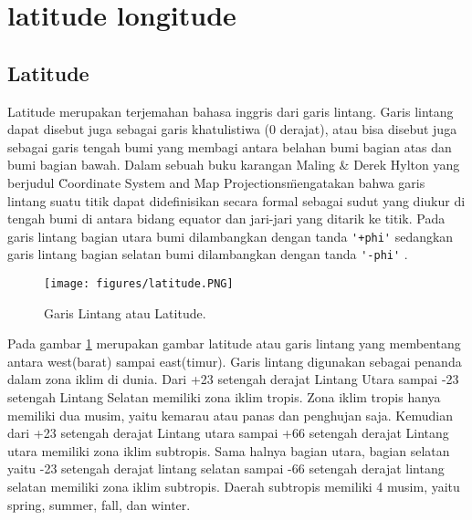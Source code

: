 
\section{latitude longitude}

\subsection{Latitude}
Latitude merupakan terjemahan bahasa inggris dari garis lintang. Garis lintang dapat disebut juga sebagai garis khatulistiwa (0 derajat), atau bisa disebut juga sebagai garis tengah bumi yang membagi antara belahan bumi bagian atas dan bumi bagian bawah.
Dalam sebuah buku karangan Maling \& Derek Hylton yang berjudul \"Coordinate System and Map Projections\" mengatakan bahwa garis lintang suatu titik dapat didefinisikan secara formal sebagai sudut yang diukur di tengah bumi di antara bidang equator dan jari-jari yang ditarik ke titik. 
Pada garis lintang bagian utara bumi dilambangkan dengan tanda \verb|'+phi'| 
sedangkan garis lintang bagian selatan bumi dilambangkan dengan tanda \verb|'-phi'| 
\cite{maling2013coordinate}. 

	\begin{figure}[ht]
	\centerline{\texttt{[image: figures/latitude.PNG]}}
	\caption{Garis Lintang atau Latitude.}
	\label{latitude}
	\end{figure}
Pada gambar \ref{latitude} merupakan gambar latitude atau garis lintang yang membentang antara west(barat) sampai east(timur).
Garis lintang digunakan sebagai penanda dalam zona iklim di dunia. Dari +23 setengah derajat Lintang Utara sampai -23 setengah Lintang Selatan memiliki zona iklim tropis. Zona iklim tropis hanya memiliki dua musim, yaitu kemarau atau panas dan penghujan saja. Kemudian dari +23 setengah derajat Lintang utara sampai +66 setengah derajat Lintang utara memiliki zona iklim subtropis. Sama halnya bagian utara, bagian selatan yaitu -23 setengah derajat lintang selatan sampai -66 setengah derajat lintang selatan memiliki zona iklim subtropis. Daerah subtropis memiliki 4 musim, yaitu spring, summer, fall, dan winter. 


